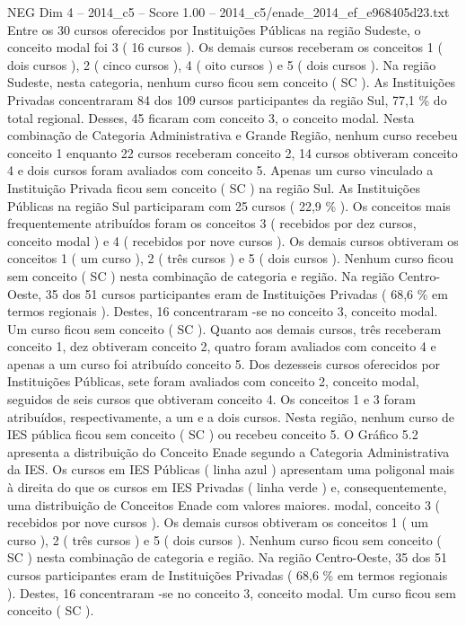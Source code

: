 \begin{textsample}{NEG Dim 4 – 2014\_c5 – Score 1.00 – 2014\_c5/enade\_2014\_ef\_e968405d23.txt}
Entre os 30 cursos oferecidos por Instituições Públicas na região Sudeste, o conceito modal foi 3 ( 16 cursos ).
Os demais cursos receberam os conceitos 1 ( dois cursos ), 2 ( cinco cursos ), 4 ( oito cursos ) e 5 ( dois cursos ).
Na região Sudeste, nesta categoria, nenhum curso ficou sem conceito ( SC ).
As Instituições Privadas concentraram 84 dos 109 cursos participantes da região Sul, 77,1 \% do total regional.
Desses, 45 ficaram com conceito 3, o conceito modal.
Nesta combinação de Categoria Administrativa e Grande Região, nenhum curso recebeu conceito 1 enquanto 22 cursos receberam conceito 2, 14 cursos obtiveram conceito 4 e dois cursos foram avaliados com conceito 5.
Apenas um curso vinculado a Instituição Privada ficou sem conceito ( SC ) na região Sul.
As Instituições Públicas na região Sul participaram com 25 cursos ( 22,9 \% ).
Os conceitos mais frequentemente atribuídos foram os conceitos 3 ( recebidos por dez cursos, conceito modal ) e 4 ( recebidos por nove cursos ).
Os demais cursos obtiveram os conceitos 1 ( um curso ), 2 ( três cursos ) e 5 ( dois cursos ).
Nenhum curso ficou sem conceito ( SC ) nesta combinação de categoria e região.
Na região Centro-Oeste, 35 dos 51 cursos participantes eram de Instituições Privadas ( 68,6 \% em termos regionais ).
Destes, 16 concentraram -se no conceito 3, conceito modal.
Um curso ficou sem conceito ( SC ).
Quanto aos demais cursos, três receberam conceito 1, dez obtiveram conceito 2, quatro foram avaliados com conceito 4 e apenas a um curso foi atribuído conceito 5.
Dos dezesseis cursos oferecidos por Instituições Públicas, sete foram avaliados com conceito 2, conceito modal, seguidos de seis cursos que obtiveram conceito 4.
Os conceitos 1 e 3 foram atribuídos, respectivamente, a um e a dois cursos.
Nesta região, nenhum curso de IES pública ficou sem conceito ( SC ) ou recebeu conceito 5.
O Gráfico 5.2 apresenta a distribuição do Conceito Enade segundo a Categoria Administrativa da IES.
Os cursos em IES Públicas ( linha azul ) apresentam uma poligonal mais à direita do que os cursos em IES Privadas ( linha verde ) e, consequentemente, uma distribuição de Conceitos Enade com valores maiores. modal, conceito 3 ( recebidos por nove cursos ).
Os demais cursos obtiveram os conceitos 1 ( um curso ), 2 ( três cursos ) e 5 ( dois cursos ).
Nenhum curso ficou sem conceito ( SC ) nesta combinação de categoria e região.
Na região Centro-Oeste, 35 dos 51 cursos participantes eram de Instituições Privadas ( 68,6 \% em termos regionais ).
Destes, 16 concentraram -se no conceito 3, conceito modal.
Um curso ficou sem conceito ( SC ).

\end{textsample}
